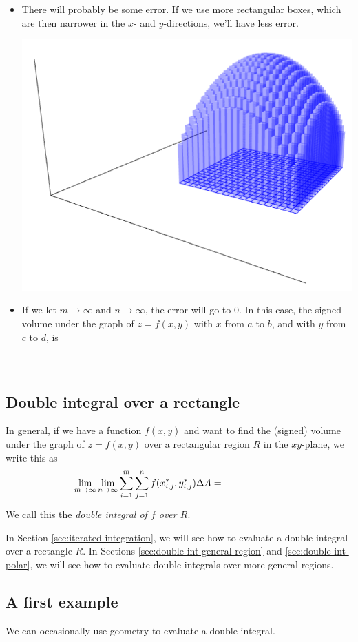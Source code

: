 \begin{itemize}
    \item There will probably be some error. If we use more rectangular boxes, which are then narrower in the $x$- and $y$-directions, we'll have less error.
    
    \pagebreak 
    
    \includegraphics[width=.5\textwidth]{images/mesh5.png}\medskip \label{img:sage-double-int-3}
    
    \item If we let $m\to\infty$ and $n\to\infty$, the error will go to 0. In this case, the signed volume under the graph of $z=f(x,y)$ with $x$ from $a$ to $b$, and with $y$ from $c$ to $d$, is
    \[
        \phantom{\lim\limits_{m\to\infty}\lim\limits_{n\to\infty}\sum\limits_{i=1}^m\sum\limits_{j=1}^nf(x_{i,j}^*,y_{i,j}^*)\Delta A.}
    \]
\end{itemize}

\subsection{Double integral over a rectangle}
\begin{defn}
    In general, if we have a function $f(x,y)$ and want to find the (signed) volume under the graph of $z=f(x,y)$ over a rectangular region $R$ in the $xy$-plane, we write this as 
    \[
        \lim\limits_{m\to\infty}\lim\limits_{n\to\infty}\sum\limits_{i=1}^m\sum\limits_{j=1}^nf(x_{i,j}^*,y_{i,j}^*)\Delta A=\phantom{\iint\limits_R f(x,y)\dA.}
    \] 
    We call this the \emph{double integral of $f$ over $R$}.
\end{defn}

In Section \ref{sec:iterated-integration}, we will see how to evaluate a double integral over a rectangle $R$. In Sections \ref{sec:double-int-general-region} and \ref{sec:double-int-polar}, we will see how to evaluate double integrals over more general regions.
\bigskip 

\subsection{A first example}
We can occasionally use geometry to evaluate a double integral.

